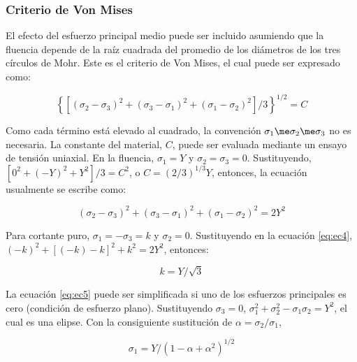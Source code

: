 \subsubsection{Criterio de Von Mises}

El efecto del esfuerzo principal medio puede ser incluido asumiendo que la fluencia depende de la raíz cuadrada 
del promedio de los diámetros de los tres círculos de Mohr. Este es el criterio de Von Mises, el cual puede ser 
expresado como:

\begin{equation} \label{eq:ec3}
\left\{ [(\sigma_2-\sigma_3)^2 + (\sigma_3-\sigma_1 )^2 + (\sigma_1-\sigma_2 )^2]/3 \right\}^{1/2} = C
\end{equation}

Como cada término está elevado al cuadrado, la convención $\sigma_1 \me \sigma_2 \me \sigma_3$ no es necesaria. 
La constante del material, $C$, puede ser evaluada mediante un ensayo de tensión uniaxial. En la fluencia, 
$\sigma_1 = Y$ y $\sigma_2 = \sigma_3 = 0$. Sustituyendo, $[0^2 + (-Y)^2 + Y^2]/3 = C^2$, o 
$C = (2/3)^{1/3} Y $, entonces, la ecuación usualmente se escribe como:

\begin{equation}\label{eq:ec4}
(\sigma_2-\sigma_3)^2 + (\sigma_3-\sigma_1 )^2 + (\sigma_1-\sigma_2 )^2 = 2Y^2
\end{equation}

Para cortante puro, $\sigma_1 = -\sigma_3 = k$ y $\sigma_2=0$. Sustituyendo en la ecuación \ref{eq:ec4}, 
$ (-k)^2 + [ (-k)-k ]^2 + k^2 = 2Y^2 $, entonces:

\begin{equation}\label{eq:ec5}
k = Y/\sqrt{3}
\end{equation}

La ecuación \ref{eq:ec5} puede ser simplificada si uno de los esfuerzos principales es cero (condición de esfuerzo plano). 
Sustituyendo $\sigma_3 = 0$, $\sigma_1^2 + \sigma_2^2 - \sigma_1 \sigma_2 = Y^2$, el cual es una elipse. Con la 
consiguiente sustitución de $\alpha = \sigma_2/\sigma_1$,

\begin{equation}
\sigma_1 = Y/(1-\alpha+\alpha^2)^{1/2}
\end{equation}



